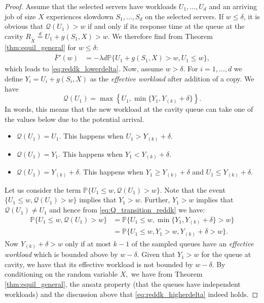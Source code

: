 \documentclass[12pt]{report}
\renewcommand{\P}{\mathbb{P}}
\newcommand{\QQ}{\mathcal{Q}}
\renewcommand{\P}{\mathbb{P}}
\begin{document}
\begin{proof}

Assume that the selected servers have workloads $U_1,\dots,U_d$ and an arriving 
job of size $X$ experiences slowdown $S_1,\dots, S_d$ on the selected servers.
If $w \leq \delta$, it is obvious that $\QQ(U_1) > w$ if and only if its response time at the queue at the cavity $R_{\tilde{X}} \overset{d}{=} U_1+g(S_1,X) > w$. We therefore find from Theorem \ref{thm:equil_general} for $w \leq \delta$:
\begin{align*}
\bar F'(w)
&= - \lambda d \P\{U_1+g(S_1,X) > w, U_1 \leq w\},
\end{align*}
which leads to \eqref{eq:reddk_lowerdelta}. Now, assume $w>\delta$. For $i=1, \ldots, d$ we define $Y_i = U_i + g(S_i,X)$ as the 
\textit{effective workload} after addition of a copy. We have 
\begin{equation}\label{eq:Q_transition_reddk}
\mathcal{Q}(U_1)=\max\left\{U_1, \min \{Y_1, Y_{(k)}
+ \delta\}\right\}.
\end{equation} 
In words, this means that the new workload at the cavity queue can take one of the values below due to the potential arrival.
\begin{itemize}[leftmargin=*]
 \item $\mathcal{Q}(U_1) = U_1.$ This happens when
  $U_1 > Y_{(k)} + \delta.$
 \item $\mathcal{Q}(U_1) = Y_1.$ This happens when
 $Y_1 < Y_{(k)} + \delta.$ 
 \item $\mathcal{Q}(U_1) = Y_{(k)} + \delta.$ This happens when
 $Y_1 \geq Y_{(k)} + \delta$ and $U_1 \leq Y_{(k)} + \delta.$
  \end{itemize}
Let us consider the term $\mathbb{P}\{U_1 \leq w, \mathcal{Q}(U_1) > w\}$. Note that the 
event $\{U_1\leq w, \mathcal{Q}(U_1) > w \}$ implies that $Y_1 > w$. Further, $Y_1 > w$ implies that 
$\mathcal{Q}(U_1) \neq U_1$ and hence from \eqref{eq:Q_transition_reddk} we have:
\begin{align*}
\mathbb{P}\{U_1\leq w, \mathcal{Q}(U_1) > w \} & = \mathbb{P}\{U_1\leq w, \min \{Y_1, Y_{(k)}
+ \delta\} > w\}\\
& = \mathbb{P}\{U_1\leq w, Y_1 > w, Y_{(k)} + \delta > w\}.
 \end{align*}
 Now $Y_{(k)} + \delta > w$ only if at most $k-1$ of the sampled queues have an \textit{effective workload} which is bounded above by $w - \delta$. Given that $Y_1 > w$ for the queue at cavity,
we have that its effective workload is not bounded by $w-\delta$. By conditioning on the random variable $X,$ we have
from Theorem \ref{thm:equil_general}, the ansatz property (that the queues have 
independent workloads) and the discussion above
that \eqref{eq:reddk_higherdelta} indeed holds.
\end{proof}
\end{document}
